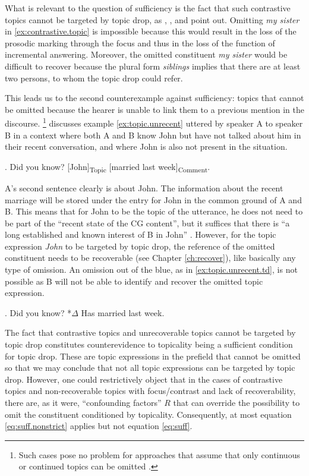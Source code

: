 What is relevant to the question of sufficiency is the fact that such contrastive topics  cannot be targeted by topic drop, as \citet[28]{fries1988}, \citet[272]{volodina2011}, and \citet[217]{volodina.onea2012} point out.
Omitting \textit{my sister} in \ref{ex:contrastive.topic} is impossible because this would result in the loss of the prosodic  marking through the focus and thus in the loss of the function of incremental answering.
Moreover, the omitted constituent \textit{my sister} would be difficult to recover  because the plural form \textit{siblings} implies that there are at least two persons, to whom the topic drop could refer.

This leads us to the second counterexample against sufficiency:
topics that cannot be omitted because the hearer is unable to link them to a previous mention in the discourse.%
\footnote{Such cases pose no problem for approaches that assume that only continuous or continued topics can be omitted \citep[e.g.,][]{schulz2006,freywald2020}.}
%
\citet{krifka2007} discusses example \ref{ex:topic.unrecent} uttered by speaker A to speaker B in a context where both A and B know John but have not talked about him in their recent conversation, and where John is also not present in the situation.

\ex.\label{ex:topic.unrecent}  Did you know? [John]\textsubscript{Topic} [married last week]\textsubscript{Comment}. \citep[43, topic-comment structure added]{krifka2007}

A's second sentence clearly is about John.
The information about the recent marriage will be stored under the entry for John in the common ground of A and B. 
This means that for John to be the topic of the utterance, he does not need to be part of the ``recent state of the CG content'', but it suffices that there is ``a long established and known interest of B in John'' \citep[43]{krifka2007}.
However, for the topic expression \textit{John} to be targeted by topic drop, the reference of the omitted constituent needs to be recoverable (see Chapter \ref{ch:recover}), like basically any type of omission.
An omission out of the blue, as in \ref{ex:topic.unrecent.td}, is not possible as B will not be able to identify and recover the omitted topic expression.

\ex.\label{ex:topic.unrecent.td}  Did you know? *$\Delta$ Has married last week.

The fact that contrastive topics  and unrecoverable topics cannot be targeted by topic drop constitutes counterevidence to topicality being a sufficient condition for topic drop.
These are topic expressions in the prefield that cannot be omitted so that we may conclude that not all topic expressions can be targeted by topic drop.
However, one could restrictively object that in the cases of contrastive topics  and non-recoverable  topics with focus/contrast  and lack of recoverability, there are, as it were, ``confounding factors'' $R$ that can override the possibility to omit the constituent conditioned by topicality.
Consequently, at most equation \ref{eq:suff.nonstrict} applies but not equation \ref{eq:suff}.%

